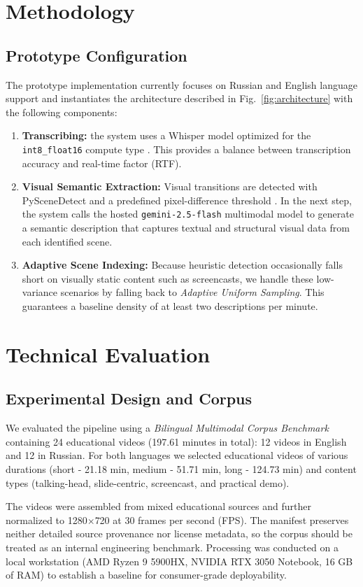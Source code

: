 ﻿\documentclass[conference]{IEEEtran}
\begin{document}
\section{Methodology}
\subsection{Prototype Configuration}
The prototype implementation currently focuses on Russian and English language support and instantiates the architecture described in Fig.~\ref{fig:architecture} with the following components:
\begin{enumerate}
\item \textbf{Transcribing:} the system uses a Whisper model optimized for the \texttt{int8\_float16} compute type \cite{Radford2022}. This provides a balance between transcription accuracy and real-time factor (RTF).
\item \textbf{Visual Semantic Extraction:} Visual transitions are detected with PySceneDetect and a predefined pixel-difference threshold \cite{PySceneDetect}. In the next step, the system calls the hosted \texttt{gemini-2.5-flash} multimodal model \cite{GeminiTeam2025} to generate a semantic description that captures textual and structural visual data from each identified scene.
\item \textbf{Adaptive Scene Indexing:} Because heuristic detection occasionally falls short on visually static content such as screencasts, we handle these low-variance scenarios by falling back to \emph{Adaptive Uniform Sampling}. This guarantees a baseline density of at least two descriptions per minute.
\end{enumerate}

\section{Technical Evaluation}
\subsection{Experimental Design and Corpus}
We evaluated the pipeline using a \emph{Bilingual Multimodal Corpus Benchmark} containing 24 educational videos (197.61 minutes in total): 12 videos in English and 12 in Russian. For both languages we selected educational videos of various durations (short - 21.18 min, medium - 51.71 min, long - 124.73 min) and content types (talking-head, slide-centric, screencast, and practical demo).

The videos were assembled from mixed educational sources and further normalized to 1280$\times$720 at 30 frames per second (FPS). The manifest preserves neither detailed source provenance nor license metadata, so the corpus should be treated as an internal engineering benchmark. Processing was conducted on a local workstation (AMD Ryzen 9 5900HX, NVIDIA RTX 3050 Notebook, 16 GB of RAM) to establish a baseline for consumer-grade deployability.
\end{document}
